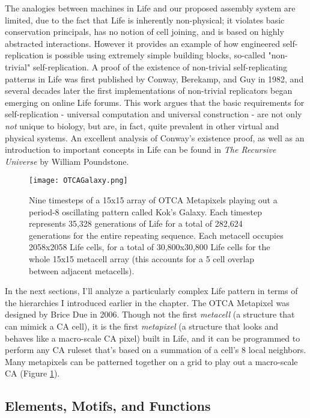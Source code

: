 {The analogies between machines in Life and our proposed assembly system are limited, due to the fact that Life is inherently non-physical; it violates basic conservation principals, has no notion of cell joining, and is based on highly abstracted interactions.  However it provides an example of how engineered self-replication is possible using extremely simple building blocks, so-called "non-trivial" self-replication.  A proof of the existence of non-trivial self-replicating patterns in Life was first published by Conway, Berekamp, and Guy in 1982\cite{Berekamp1982}, and several decades later the first implementations of non-trivial replicators began emerging on online Life forums.  This work argues that the basic requirements for self-replication - universal computation and universal construction - are not only \textit{not} unique to biology, but are, in fact, quite prevalent in other virtual and physical systems.  An excellent analysis of Conway's existence proof, as well as an introduction to important concepts in Life can be found in \textit{The Recursive Universe} by William Poundstone\cite{Poundstone1985}.\\

\begin{figure}
  \texttt{[image: OTCAGalaxy.png]}
  \caption{Nine timesteps of a 15x15 array of OTCA Metapixels playing out a period-8 oscillating pattern called Kok's Galaxy.  Each timestep represents 35,328 generations of Life for a total of 282,624 generations for the entire repeating sequence.  Each metacell occupies 2058x2058 Life cells, for a total of 30,800x30,800 Life cells for the whole 15x15 metacell array (this accounts for a 5 cell overlap between adjacent metacells).}
  \label{fig:OTCAGalaxy}
\end{figure}

In the next sections, I'll analyze a particularly complex Life pattern in terms of the hierarchies I introduced earlier in the chapter.  The OTCA Metapixel was designed by Brice Due in 2006\cite{Due2006}\cite{Ghassaei2015}.  Though not the first \textit{metacell} (a structure that can mimick a CA cell), it is the first \textit{metapixel} (a structure that looks and behaves like a macro-scale CA pixel) built in Life, and it can be programmed to perform any CA ruleset that's based on a summation of a cell's 8 local neighbors.  Many metapixels can be patterned together on a grid to play out a macro-scale CA (Figure \ref{fig:OTCAGalaxy}).

\subsection{Elements, Motifs, and Functions}

}
